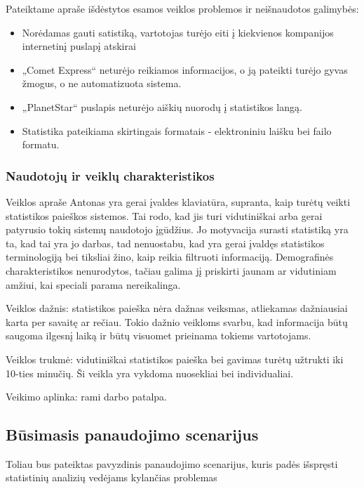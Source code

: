 \documentclass{VUMIFPSkursinis}
\begin{document}
\bigskip
Pateiktame apraše išdėstytos esamos veiklos problemos ir neišnaudotos galimybės:  
\begin{itemize}
\item Norėdamas gauti satistiką, vartotojas turėjo eiti į kiekvienos kompanijos internetinį puslapį atskirai
\item „Comet Express“ neturėjo reikiamos informacijos, o ją pateikti turėjo gyvas žmogus, o ne automatizuota sistema.
\item „PlanetStar“ puslapis neturėjo aiškių nuorodų į statistikos langą.
\item Statistika pateikiama skirtingais formatais - elektroniniu laišku bei failo formatu.
\end{itemize}

\subsubsection{Naudotojų ir veiklų charakteristikos}
Veiklos apraše Antonas yra gerai įvaldes klaviatūra, supranta, kaip turėtų veikti statistikos paieškos sistemos. Tai rodo, kad jis turi vidutiniškai arba gerai patyrusio tokių sistemų naudotojo įgūdžius. Jo motyvacija surasti statistiką yra ta, kad tai yra jo darbas, tad nenuostabu, kad yra gerai įvaldęs statistikos terminologiją bei tiksliai žino, kaip reikia filtruoti informaciją. Demografinės charakteristikos nenurodytos, tačiau galima jį priskirti jaunam ar vidutiniam amžiui, kai speciali parama nereikalinga. 

Veiklos dažnis: statistikos paieška nėra dažnas veiksmas, atliekamas dažniausiai karta per savaitę ar rečiau. Tokio dažnio veikloms svarbu, kad informacija būtų saugoma ilgesnį laiką ir būtų visuomet prieinama tokiems vartotojams. 

Veiklos trukmė: vidutiniškai statistikos paieška bei gavimas turėtų užtrukti iki 10-ties minučių. Ši veikla yra vykdoma nuosekliai bei individualiai.

Veikimo aplinka: rami darbo patalpa. 

\subsection{Būsimasis panaudojimo scenarijus}
Toliau bus pateiktas pavyzdinis panaudojimo scenarijus, kuris padės išspręsti statistinių analizių vedėjams kylančias problemas
\end{document}
